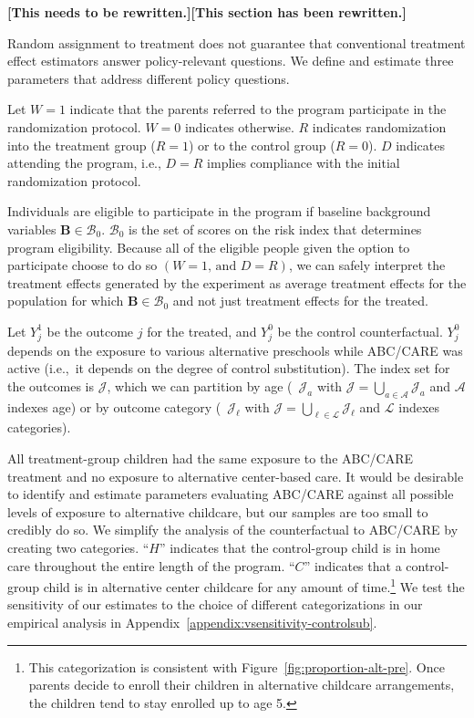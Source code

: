 \textbf{[This needs to be rewritten.][This section has been rewritten.]}

Random assignment to treatment does not guarantee that conventional treatment effect estimators answer policy-relevant questions. We define and estimate three parameters that address different policy questions.

Let $W=1$ indicate that the parents referred to the program participate in the randomization protocol. $W=0$ indicates otherwise. $R$ indicates randomization into the treatment group ($R = 1$) or to the control group ($R = 0$). $D$ indicates attending the program, i.e., $D = R$ implies compliance with the initial randomization protocol.

Individuals are eligible to participate in the program if baseline background variables $\bm{B}\in\mathcal{B}_0$. $\mathcal{B}_0$ is the set of scores on the risk index that determines program eligibility. Because all of the eligible people given the option to participate choose to do so $(W=1\text{, and } D=R)$, we can safely interpret the treatment effects generated by the experiment as average treatment effects for the population for which $\bm{B}\in\mathcal{B}_0$ and not just treatment effects for the treated.

Let $Y^1_{j}$ be the outcome $j$ for the treated, and $Y^0_{j}$ be the control counterfactual. $Y^0_{j}$ depends on the exposure to various alternative preschools while ABC/CARE was active (i.e.,\ it depends on the degree of control substitution). The index set for the outcomes is $\mathcal{J}$, which we can partition by age (\ $\mathcal{J}_a$ with $\mathcal{J} = \bigcup \limits _{a \in \mathcal{A}} \mathcal{J}_a$ and $\mathcal{A}$ indexes age) or by outcome category (\ $\mathcal{J}_\ell$ with $\mathcal{J} = \bigcup \limits _{\ell \in \mathcal{L}} \mathcal{J}_\ell$ and $\mathcal{L}$ indexes categories). 

 All treatment-group children had the same exposure to the ABC/CARE treatment and no exposure to alternative center-based care. It would be desirable to identify and estimate parameters evaluating ABC/CARE against all possible levels of exposure to alternative childcare, but our samples are too small to credibly do so. We simplify the analysis of the counterfactual to ABC/CARE by creating two categories. ``$H$'' indicates that the control-group child is in home care throughout the entire length of the program. ``$C$'' indicates that a control-group child is in alternative center childcare for any amount of time.\footnote{This categorization is consistent with Figure~\ref{fig:proportion-alt-pre}. Once parents decide to enroll their children in alternative childcare arrangements, the children tend to stay enrolled up to age 5.} We test the sensitivity of our estimates to the choice of different categorizations in our empirical analysis in Appendix~\ref{appendix:vsensitivity-controlsub}.

